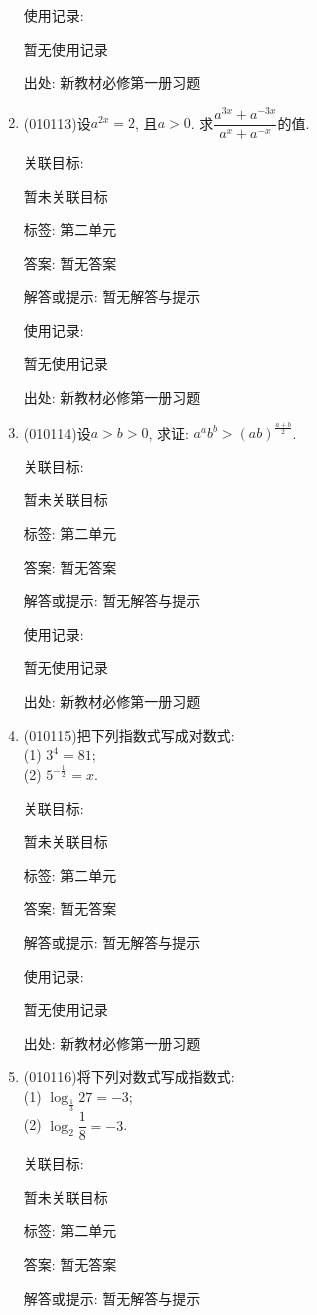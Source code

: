 \documentclass[10pt,a4paper]{article}
\begin{document}
\begin{enumerate}[1.]
使用记录:

暂无使用记录


出处: 新教材必修第一册习题
\item { (010113)}设$a^{2x}=2$, 且$a>0$. 求$\dfrac{a^{3x}+a^{-3x}}{a^x+a^{-x}}$的值.


关联目标:

暂未关联目标



标签: 第二单元

答案: 暂无答案

解答或提示: 暂无解答与提示

使用记录:

暂无使用记录


出处: 新教材必修第一册习题
\item { (010114)}设$a>b>0$, 求证: $a^ab^b>(ab)^\frac{a+b}2$.


关联目标:

暂未关联目标



标签: 第二单元

答案: 暂无答案

解答或提示: 暂无解答与提示

使用记录:

暂无使用记录


出处: 新教材必修第一册习题
\item { (010115)}把下列指数式写成对数式:\\
(1) $3^4=81$;\\
(2) $5^{-\frac1 2}=x$.


关联目标:

暂未关联目标



标签: 第二单元

答案: 暂无答案

解答或提示: 暂无解答与提示

使用记录:

暂无使用记录


出处: 新教材必修第一册习题
\item { (010116)}将下列对数式写成指数式:\\
(1) $\log_{\frac 13}27=-3$;\\
(2) $\log_2\dfrac 18=-3$.


关联目标:

暂未关联目标



标签: 第二单元

答案: 暂无答案

解答或提示: 暂无解答与提示


\end{enumerate}
\end{document}
